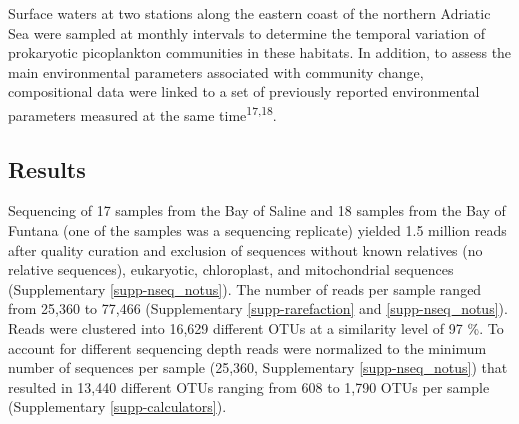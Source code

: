 \documentclass[
  12pt,
]{article}
\begin{document}
Surface waters at two stations along the eastern coast of the northern
Adriatic Sea were sampled at monthly intervals to determine the temporal
variation of prokaryotic picoplankton communities in these habitats. In
addition, to assess the main environmental parameters associated with
community change, compositional data were linked to a set of previously
reported environmental parameters measured at the same
time\textsuperscript{17,18}.

\newpage

\hypertarget{results}{%
\subsection{Results}\label{results}}

Sequencing of 17 samples from the Bay of Saline and 18 samples from the
Bay of Funtana (one of the samples was a sequencing replicate) yielded
1.5 million reads after quality curation and exclusion of sequences
without known relatives (no relative sequences), eukaryotic,
chloroplast, and mitochondrial sequences (Supplementary
\autoref{supp-nseq_notus}). The number of reads per sample ranged from
25,360 to 77,466 (Supplementary \autoref{supp-rarefaction} and
\autoref{supp-nseq_notus}). Reads were clustered into 16,629 different
OTUs at a similarity level of 97 \si{\percent}. To account for different
sequencing depth reads were normalized to the minimum number of
sequences per sample (25,360, Supplementary \autoref{supp-nseq_notus})
that resulted in 13,440 different OTUs ranging from 608 to 1,790 OTUs
per sample (Supplementary \autoref{supp-calculators}).
\end{document}
